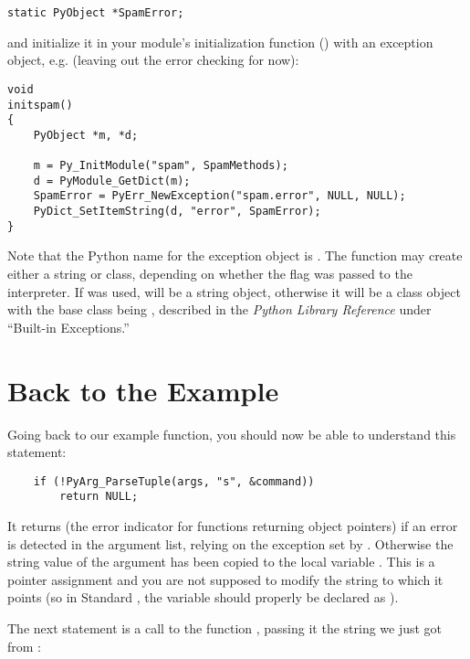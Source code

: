 \documentclass{manual}
\begin{document}
\begin{verbatim}
static PyObject *SpamError;
\end{verbatim}

and initialize it in your module's initialization function
() with an exception object, e.g. (leaving out
the error checking for now):

\begin{verbatim}
void
initspam()
{
    PyObject *m, *d;

    m = Py_InitModule("spam", SpamMethods);
    d = PyModule_GetDict(m);
    SpamError = PyErr_NewException("spam.error", NULL, NULL);
    PyDict_SetItemString(d, "error", SpamError);
}
\end{verbatim}

Note that the Python name for the exception object is
.  The  function
may create either a string or class, depending on whether the
 flag was passed to the interpreter.  If  was used,
 will be a string object, otherwise it will be a
class object with the base class being ,
described in the \emph{Python Library Reference} under ``Built-in
Exceptions.''


\section{Back to the Example}
\label{backToExample}

Going back to our example function, you should now be able to
understand this statement:

\begin{verbatim}
    if (!PyArg_ParseTuple(args, "s", &command))
        return NULL;
\end{verbatim}

It returns \NULL{} (the error indicator for functions returning
object pointers) if an error is detected in the argument list, relying
on the exception set by .  Otherwise the
string value of the argument has been copied to the local variable
.  This is a pointer assignment and you are not supposed
to modify the string to which it points (so in Standard \C{}, the variable
 should properly be declared as ).

The next statement is a call to the \UNIX{} function
, passing it the string we just got from
:
\end{document}
